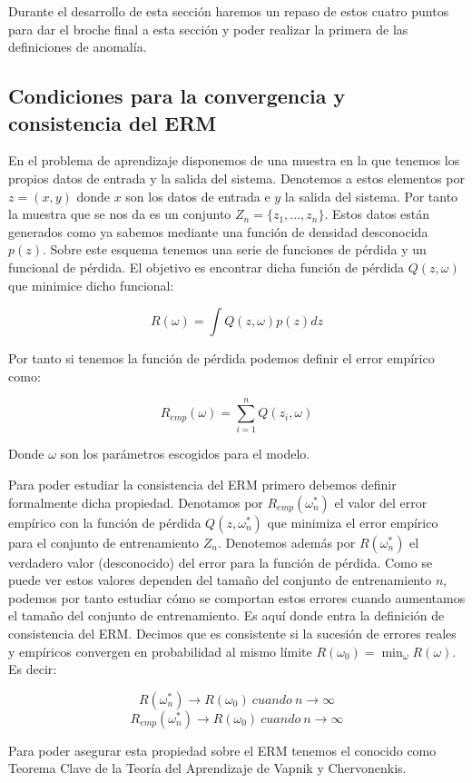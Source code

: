 Durante el desarrollo de esta sección haremos un repaso de estos cuatro puntos para dar el broche final a esta sección y poder realizar la primera de las definiciones de anomalía.

\subsection{Condiciones para la convergencia y consistencia del ERM}

En el problema de aprendizaje disponemos de una muestra en la que tenemos los propios datos de entrada y la salida del sistema. Denotemos a estos elementos por $z=(x,y)$ donde $x$ son los datos de entrada e $y$ la salida del sistema. Por tanto la muestra que se nos da es un conjunto $Z_n = \{ z_1 , ... , z_n \}$. Estos datos están generados como ya sabemos mediante una función de densidad desconocida $p(z)$. Sobre este esquema tenemos una serie de funciones de pérdida y un funcional de pérdida. El objetivo es encontrar dicha función de pérdida $Q(z,\omega )$ que minimice dicho funcional:

$$R(\omega) = \int Q(z,\omega) p(z)dz$$

Por tanto si tenemos la función de pérdida podemos definir el error empírico como:

$$R_{emp}(\omega) = \sum_{i=1}^{n}Q(z_i, \omega)$$

Donde $\omega$ son los parámetros escogidos para el modelo.

Para poder estudiar la consistencia del ERM primero debemos definir formalmente dicha propiedad. Denotamos por $R_{emp}(\omega_n^*)$ el valor del error empírico con la función de pérdida $Q(z,\omega_n^*)$ que minimiza el error empírico para el conjunto de entrenamiento $Z_n$. Denotemos además por $R(\omega_n^*)$ el verdadero valor (desconocido) del error para la función de pérdida. Como se puede ver estos valores dependen del tamaño del conjunto de entrenamiento $n$, podemos por tanto estudiar cómo se comportan estos errores cuando aumentamos el tamaño del conjunto de entrenamiento. Es aquí donde entra la definición de consistencia del ERM. Decimos que es consistente si la sucesión de errores reales y empíricos convergen en probabilidad al mismo límite $R(\omega_0) = \min_{\omega} R(\omega)$. Es decir:

$$R(\omega_n^*) \rightarrow R(\omega_0) \ cuando \ n\rightarrow \infty$$
$$R_{emp}(\omega_n^*) \rightarrow R(\omega_0) \ cuando \ n\rightarrow \infty$$

Para poder asegurar esta propiedad sobre el ERM tenemos el conocido como Teorema Clave de la Teoría del Aprendizaje de Vapnik y Chervonenkis.


